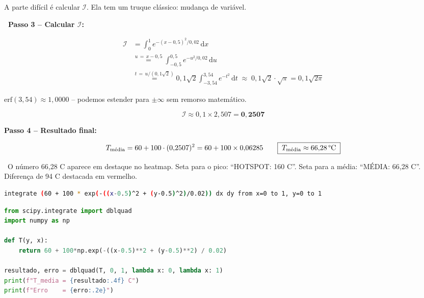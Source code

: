 \begin{fala}
A parte difícil é calcular $\mathcal{I}$. Ela tem um truque clássico:
mudança de variável.
\end{fala}

\begin{mathblock}
\textbf{\color{corMath}\faSuperscript\ Passo 3 -- Calcular $\mathcal{I}$:}

\begin{align*}
  \mathcal{I}
  &= \int_0^1 e^{-(x-0{,}5)^2/0{,}02}\,\mathrm{d}x \\[6pt]
  &\overset{u\,=\,x-0{,}5}{=}
    \int_{-0{,}5}^{0{,}5} e^{-u^2/0{,}02}\,\mathrm{d}u \\[6pt]
  &\overset{t\,=\,u/(0{,}1\sqrt{2})}{=}
    0{,}1\sqrt{2}
    \int_{-3{,}54}^{3{,}54} e^{-t^2}\,\mathrm{d}t
    \;\approx\;
    0{,}1\sqrt{2}\cdot\sqrt{\pi}
    = 0{,}1\sqrt{2\pi}
\end{align*}

{\small\color{gray}$\text{erf}(3{,}54) \approx 1{,}0000$ -- podemos estender para
$\pm\infty$ sem remorso matemático.}

\[
  \mathcal{I} \approx 0{,}1 \times 2{,}507 = \mathbf{0{,}2507}
\]

\textbf{\color{corMath}Passo 4 -- Resultado final:}

\[
  T_{\text{média}}
  = 60 + 100 \cdot (0{,}2507)^2
  = 60 + 100 \times 0{,}06285
  \qquad
  \boxed{\;T_{\text{média}} \approx 66{,}28\,\text{\textdegree C}\;}
\]
\end{mathblock}

\begin{visual}
\faFilm\ O número 66,28 {\textdegree}C aparece em destaque no heatmap.
Seta para o pico: ``HOTSPOT: 160 {\textdegree}C''. Seta para a média: ``MÉDIA: 66,28 {\textdegree}C''.
Diferença de 94 {\textdegree}C destacada em vermelho.
\end{visual}

\begin{lstlisting}[language=bash]
integrate (60 + 100 * exp(-((x-0.5)^2 + (y-0.5)^2)/0.02)) dx dy from x=0 to 1, y=0 to 1
\end{lstlisting}

\begin{lstlisting}[caption={Integral dupla com SciPy}, language=Python]
from scipy.integrate import dblquad
import numpy as np

def T(y, x):
    return 60 + 100*np.exp(-((x-0.5)**2 + (y-0.5)**2) / 0.02)

resultado, erro = dblquad(T, 0, 1, lambda x: 0, lambda x: 1)
print(f"T_media = {resultado:.4f} C")
print(f"Erro    = {erro:.2e}")
\end{lstlisting}

